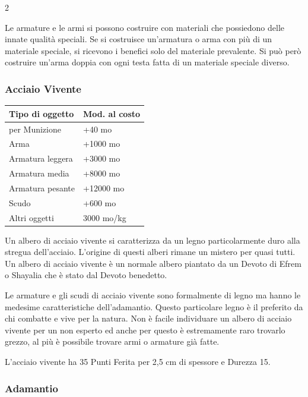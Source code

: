 \begin{multicols}{2}

Le armature e le armi si possono costruire con materiali che possiedono delle innate qualità speciali. Se si costruisce un'armatura o arma con più di un materiale speciale, si ricevono i benefici solo del materiale prevalente. Si può però costruire un'arma doppia con ogni testa fatta di un materiale speciale diverso.

\subsubsection{Acciaio Vivente}

\label{acciaio-vivente}

\noindent\begin{tabularx}{\linewidth}{Xl}
	\toprule
\rowcolor{gray!20}\textbf{Tipo di oggetto} & \textbf{Mod. al costo}\\
\toprule
per Munizione & +40 mo \\
\rowcolor{gray!20}Arma & +1000 mo\\
Armatura leggera & +3000 mo\\
\rowcolor{gray!20}Armatura media & +8000 mo\\
Armatura pesante & +12000 mo\\
\rowcolor{gray!20}Scudo & +600 mo\\
Altri oggetti & 3000 mo/kg
\end{tabularx}

\medskip
Un albero di acciaio vivente si caratterizza da un legno particolarmente duro alla stregua dell'acciaio. L'origine di questi alberi rimane un mistero per quasi tutti. Un albero di acciaio vivente è un normale albero piantato da un Devoto di Efrem o Shayalia che è stato dal Devoto benedetto.

Le armature e gli scudi di acciaio vivente sono formalmente di legno ma hanno le medesime caratteristiche dell'adamantio. Questo particolare legno è il preferito da chi combatte e vive per la natura. Non è facile individuare un albero di acciaio vivente per un non esperto ed anche per questo è estremamente raro trovarlo grezzo, al più è possibile trovare armi o armature già fatte.

L'acciaio vivente ha 35 Punti Ferita per 2,5 cm di spessore e Durezza 15.

\subsubsection{Adamantio}


\end{multicols}
